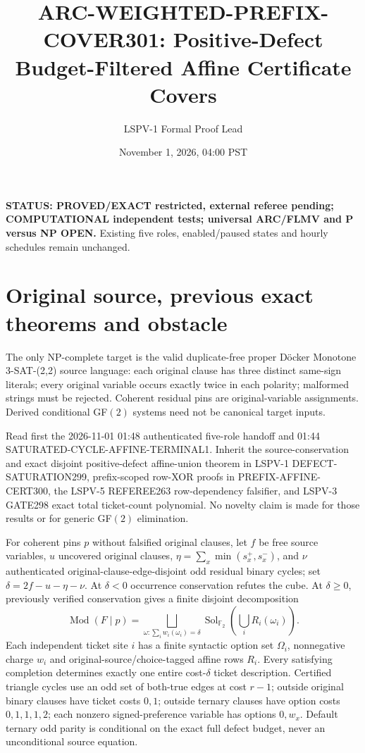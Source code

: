 \documentclass[11pt]{article}
\title{ARC-WEIGHTED-PREFIX-COVER301: Positive-Defect Budget-Filtered Affine Certificate Covers}
\author{LSPV-1 Formal Proof Lead}
\date{November 1, 2026, 04:00 PST}
\newcommand{\GF}{\mathbb F_2}
\begin{document}
\maketitle
\noindent\textbf{STATUS: PROVED/EXACT restricted, external referee pending; COMPUTATIONAL independent tests; universal ARC/FLMV and P versus NP OPEN.} Existing five roles, enabled/paused states and hourly schedules remain unchanged.

\section{Original source, previous exact theorems and obstacle}
The only NP-complete target is the valid duplicate-free proper D\"ocker Monotone 3-SAT-(2,2) source language: each original clause has three distinct same-sign literals; every original variable occurs exactly twice in each polarity; malformed strings must be rejected. Coherent residual pins are original-variable assignments. Derived conditional GF$(2)$ systems need not be canonical target inputs.

Read first the 2026-11-01 01:48 authenticated five-role handoff and 01:44 SATURATED-CYCLE-AFFINE-TERMINAL1. Inherit the source-conservation and exact disjoint positive-defect affine-union theorem in LSPV-1 DEFECT-SATURATION299, prefix-scoped row-XOR proofs in PREFIX-AFFINE-CERT300, the LSPV-5 REFEREE263 row-dependency falsifier, and LSPV-3 GATE298 exact total ticket-count polynomial. No novelty claim is made for those results or for generic GF$(2)$ elimination.

For coherent pins $p$ without falsified original clauses, let $f$ be free source variables, $u$ uncovered original clauses, $\eta=\sum_x\min(s_x^+,s_x^-)$, and $\nu$ authenticated original-clause-edge-disjoint odd residual binary cycles; set $\delta=2f-u-\eta-\nu$. At $\delta<0$ occurrence conservation refutes the cube. At $\delta\ge0$, previously verified conservation gives a finite disjoint decomposition
\[
\operatorname{Mod}(F\mid p)=
\bigsqcup_{\omega:\sum_i w_i(\omega_i)=\delta}
\operatorname{Sol}_{\GF}\!\left(\bigcup_iR_i(\omega_i)\right). \tag{1}
\]
Each independent ticket site $i$ has a finite syntactic option set $\Omega_i$, nonnegative charge $w_i$ and original-source/choice-tagged affine rows $R_i$. Every satisfying completion determines exactly one entire cost-$\delta$ ticket description. Certified triangle cycles use an odd set of both-true edges at cost $r-1$; outside original binary clauses have ticket costs $0,1$; outside ternary clauses have option costs $0,1,1,1,2$; each nonzero signed-preference variable has options $0,w_x$. Default ternary odd parity is conditional on the exact full defect budget, never an unconditional source equation.
\end{document}
